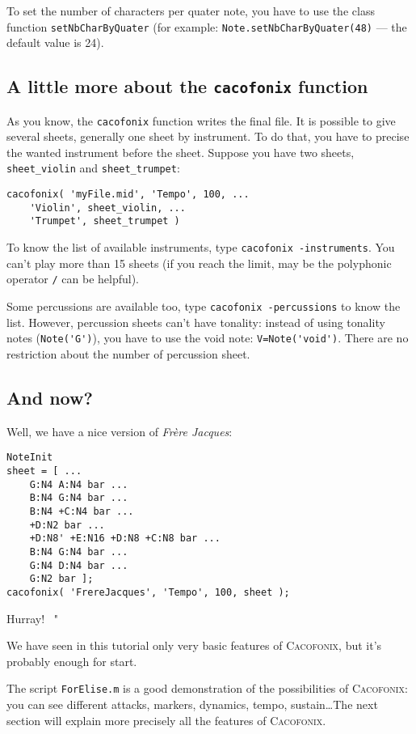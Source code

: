\documentclass{article}
\newcommand\cacofonix{\textsc{Cacofonix}\xspace}
\newcommand\frerejaques{\emph{Fr\`ere Jacques}\xspace}
\newenvironment{meenv}{ \par \noindent \makebox[6em][r]{ \textcolor{mecolor}{Me}: " --~}}{~"}
\newcommand{ \me }[1]{%
\begin{meenv}%
	#1%
\end{meenv} }
\begin{document}
To set the number of characters per quater note, you have to use the class function \lstinline!setNbCharByQuater! (for example: \lstinline!Note.setNbCharByQuater(48)! --- the default value is 24).

\subsection{A little more about the \lstinline!cacofonix! function}

As you know, the \lstinline!cacofonix! function writes the final file. It is possible to give several sheets, generally one sheet by instrument. To do that, you have to precise the wanted instrument before the sheet. Suppose you have two sheets, \lstinline!sheet_violin! and \lstinline!sheet_trumpet!:
\begin{lstlisting}
cacofonix( 'myFile.mid', 'Tempo', 100, ...
	'Violin', sheet_violin, ...
	'Trumpet', sheet_trumpet )
\end{lstlisting}

To know the list of available instruments, type \lstinline!cacofonix -instruments!. You can't play more than 15 sheets (if you reach the limit, may be the polyphonic operator \lstinline!/! can be helpful).

Some percussions are available too, type \lstinline!cacofonix -percussions! to know the list. However, percussion sheets can't have tonality: instead of using tonality notes (\lstinline!Note('G')!), you have to use the void note: \lstinline!V=Note('void')!. There are no restriction about the number of percussion sheet.

\subsection{And now?}

Well, we have a nice version of \frerejaques:
\begin{lstlisting}
NoteInit
sheet = [ ...
	G:N4 A:N4 bar ...
	B:N4 G:N4 bar ...
	B:N4 +C:N4 bar ...
	+D:N2 bar ...
	+D:N8' +E:N16 +D:N8 +C:N8 bar ...
	B:N4 G:N4 bar ...
	G:N4 D:N4 bar ...
	G:N2 bar ];
cacofonix( 'FrereJacques', 'Tempo', 100, sheet );
\end{lstlisting}

\me{Hurray!}

We have seen in this tutorial only very basic features of \cacofonix, but it's probably enough for start.

The script \texttt{ForElise.m} is a good demonstration of the possibilities of \cacofonix: you can see different attacks, markers, dynamics, tempo, sustain\dots The next section will explain more precisely all the features of \cacofonix.
\end{document}
